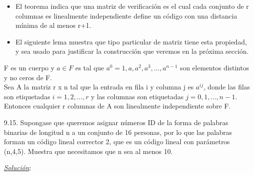 \begin{frame}  \small  

\begin{itemize} 
\item  El teorema indica que una matriz de verificación es el cual cada conjunto de r columnas es linealmente independiente define un código con una distancia mínima de al menos r+1. 

\item El siguiente lema muestra que tipo particular de matriz tiene esta propiedad, y sea usado para justificar la construcción que veremos en la próxima sección.
\end{itemize}


\begin{lema}

F es un cuerpo y $a \in F$   es tal que $a^0=1,a,a^2,a^3,\ldots , a^{n-1}$ son elementos distintos y no ceros de F. \\
\vspace*{5pt}
Sea A la matriz r x n tal que la entrada en fila i y columna j es $a^{ij}$, donde las filas son etiquetadas $ i = 1,2,\ldots ,r$ y las columnas son etiquetadas $ j = 0,1,\ldots ,n-1$. \\
\vspace*{5pt}
Entonces cualquier r columnas de A son linealmente independiente sobre F.\\

\end{lema}
\end{frame} 



\begin{frame}  \small \begin{ejercicio} 

9.15. Supongase que queremos asignar números ID de la forma de palabras binarias de longitud n a un conjunto de 16 personas, por lo que las palabras forman un  código lineal corrector 2, que es un código lineal con parámetros (n,4,5). Muestra que necesitamos que n sea al menos 10.

\end{ejercicio} \pause \textit{\underline{Solución}}:\\ \end{frame} 


